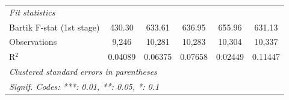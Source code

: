 \begin{table}[htbp]
{\begin{tabular}{lccccc}
      \midrule
      \emph{Fit statistics}\\
      Bartik F-stat (1st stage)   & 430.30                     & 633.61                    & 636.95                        & 655.96                      & 631.13\\  
      Observations                        & 9,246                      & 10,281                    & 10,283                        & 10,304                      & 10,337\\  
      R$^2$                               & 0.04089                    & 0.06375                   & 0.07658                       & 0.02449                     & 0.11447\\  
      \midrule \midrule
      \multicolumn{6}{l}{\emph{Clustered standard errors in parentheses}}\\
      \multicolumn{6}{l}{\emph{Signif. Codes: ***: 0.01, **: 0.05, *: 0.1}}\\
   \end{tabular}}
\end{table}


